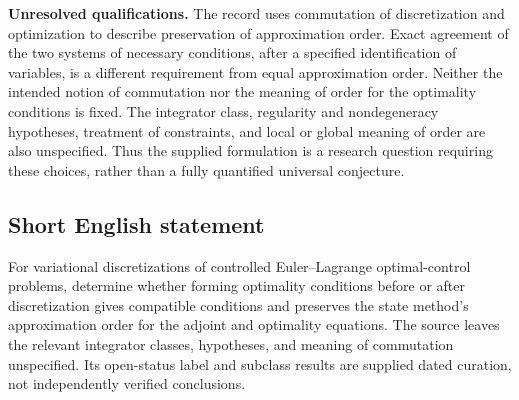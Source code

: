 \documentclass[11pt]{article}
\begin{document}
\textbf{Unresolved qualifications.} The record uses commutation of discretization and optimization to describe preservation of approximation order. Exact agreement of the two systems of necessary conditions, after a specified identification of variables, is a different requirement from equal approximation order. Neither the intended notion of commutation nor the meaning of order for the optimality conditions is fixed. The integrator class, regularity and nondegeneracy hypotheses, treatment of constraints, and local or global meaning of order are also unspecified. Thus the supplied formulation is a research question requiring these choices, rather than a fully quantified universal conjecture.
\subsection{Short English statement}
For variational discretizations of controlled Euler--Lagrange optimal-control problems, determine whether forming optimality conditions before or after discretization gives compatible conditions and preserves the state method's approximation order for the adjoint and optimality equations. The source leaves the relevant integrator classes, hypotheses, and meaning of commutation unspecified. Its open-status label and subclass results are supplied dated curation, not independently verified conclusions.
\end{document}
